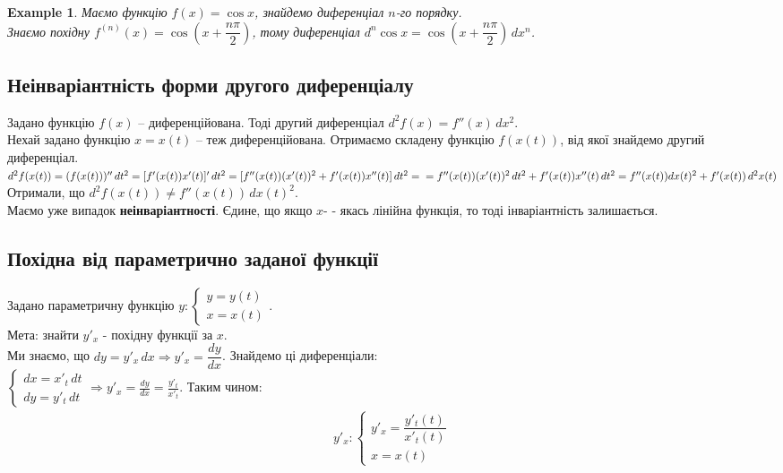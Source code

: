 \documentclass[a4paper, 14pt]{article}
\theoremstyle{theoremdd}
\theoremstyle{theoremdd}
\theoremstyle{theoremdd}
\theoremstyle{theoremdd}
\newtheorem{example}[theorem]{Example}
\theoremstyle{theoremdd}
\theoremstyle{theoremdd}
\theoremstyle{theoremdd}
\theoremstyle{theoremdd}
\begin{document}
\begin{example}
Маємо функцію $f(x) = \cos x$, знайдемо диференціал $n$-го порядку.\\
Знаємо похідну $f^{(n)}(x) = \cos \left(x + \dfrac{n \pi}{2} \right)$, тому диференціал $d^n \cos x = \cos \left(x + \dfrac{n \pi}{2} \right) \,dx^n$.
\end{example}

\subsection{Неінваріантність форми другого диференціалу}
Задано функцію $f(x)$ -- диференційована. Тоді другий диференціал $d^2f(x) = f''(x)\,dx^2$.\\
Нехай задано функцію $x = x(t)$ -- теж диференційована. Отримаємо складену функцію $f(x(t))$, від якої знайдемо другий диференціал.\\
$d^2 f(x(t)) = (f(x(t)))'' \,dt^2 = [f'(x(t))x'(t)]'\,dt^2 = [f''(x(t))(x'(t))^2 + f'(x(t))x''(t)]\,dt^2 = \\ 
= f''(x(t))(x'(t))^2\,dt^2 + f'(x(t))x''(t)\,dt^2 = f''(x(t)) dx(t)^2 + f'(x(t))\,d^2 x(t)$\\
Отримали, що $d^2f(x(t)) \neq f''(x(t))\,dx(t)^2$.\\
Маємо уже випадок \textbf{неінваріантності}. Єдине, що якщо $x$- - якась лінійна функція, то тоді інваріантність залишається.

\subsection{Похідна від параметрично заданої функції}
Задано параметричну функцію $y: \begin{cases} y = y(t) \\ x = x(t) \end{cases}$.\\
Мета: знайти $y'_x$ - похідну функції за $x$.\\
Ми знаємо, що $dy = y'_x \,dx \Rightarrow y'_x = \dfrac{dy}{dx}$. Знайдемо ці диференціали:\\
$\begin{cases} dx = x'_t\,dt \\ dy = y'_t\,dt \end{cases} \Rightarrow \displaystyle y'_x = \frac{dy}{dx} = \frac{y'_t}{x'_t}$. Таким чином:
\begin{align*}
y'_x: \begin{cases} y'_x = \dfrac{y'_t(t)}{x'_t(t)} \\ x = x(t) \end{cases}
\end{align*}
\end{document}
